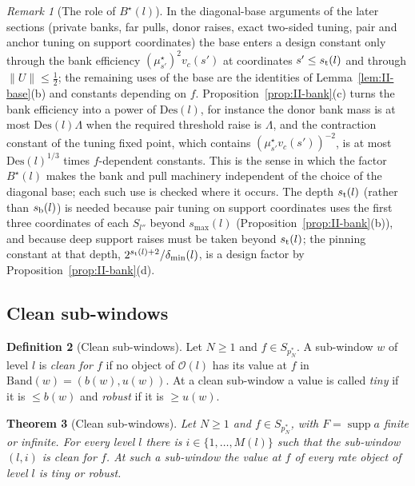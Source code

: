 \documentclass[10pt]{amsart}
\newtheorem{theorem}{Theorem}[section]
\theoremstyle{definition}
\newtheorem{definition}[theorem]{Definition}
\theoremstyle{remark}
\newtheorem{remark}[theorem]{Remark}
\newcommand{\supp}{\operatorname{supp}}
\begin{document}
\begin{remark}[The role of $B^\star(l)$]\label{rem:II-baseindep}
In the diagonal-base arguments of the later sections (private banks,
far pulls, donor raises, exact two-sided tuning, pair and anchor tuning
on support coordinates) the base enters a design constant only through
the bank efficiency $(\mu^\star_{s'})^2v_c(s')$ at coordinates
$s'\le s_{\rm t}(l)$ and through $\|U\|\le\frac12$; the remaining uses of
the base are the identities of Lemma~\ref{lem:II-base}(b) and constants
depending on $f$.  Proposition~\ref{prop:II-bank}(c) turns the bank
efficiency into a power of $\mathrm{Des}(l)$, for instance the donor bank
mass is at most $\mathrm{Des}(l)\Lambda$ when the required threshold raise
is $\Lambda$, and the contraction constant of the tuning fixed point,
which contains $(\mu^\star_{s'}v_c(s'))^{-2}$, is at most
$\mathrm{Des}(l)^{1/3}$ times $f$-dependent constants.  This is the sense
in which the factor $B^\star(l)$ makes the bank and pull machinery
independent of the choice of the diagonal base; each such use is checked
where it occurs.  The depth $s_{\rm t}(l)$ (rather than $s_{\rm b}(l)$)
is needed because pair tuning on support coordinates uses the first three
coordinates of each $S_{l''}$ beyond $s_{\max}(l)$
(Proposition~\ref{prop:II-bank}(b)), and because deep support raises must
be taken beyond $s_{\rm t}(l)$; the pinning constant at that depth,
$2^{s_{\rm t}(l)+2}/\delta_{\min}(l)$, is a design factor by
Proposition~\ref{prop:II-bank}(d).
\end{remark}

\subsection{Clean sub-windows}

\begin{definition}[Clean sub-windows]\label{def:II-clean}
Let $N\ge1$ and $f\in S_{p_N^*}$.  A sub-window $w$ of level $l$ is
\emph{clean for $f$} if no object of $\mathcal O(l)$ has its value at $f$
in $\mathrm{Band}(w)=(b(w),u(w))$.  At a clean sub-window a value is
called \emph{tiny} if it is $\le b(w)$ and \emph{robust} if it is
$\ge u(w)$.
\end{definition}

\begin{theorem}[Clean sub-windows]\label{thm:II-clean}
Let $N\ge1$ and $f\in S_{p_N^*}$, with $F=\supp a$ finite or infinite.
For every level $l$ there is $i\in\{1,\dots,M(l)\}$ such that the
sub-window $(l,i)$ is clean for $f$.  At such a sub-window the value at
$f$ of every rate object of level $l$ is tiny or robust.
\end{theorem}
\end{document}
